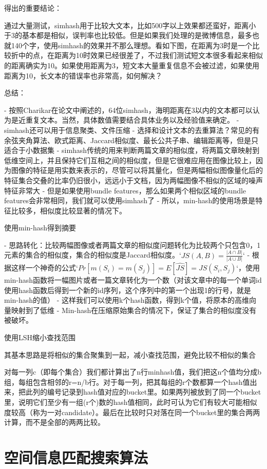 得出的重要结论：

通过大量测试，simhash用于比较大文本，比如500字以上效果都还蛮好，距离小于3的基本都是相似，误判率也比较低。但是如果我们处理的是微博信息，最多也就140个字，使用simhash的效果并不那么理想。看如下图，在距离为3时是一个比较折中的点，在距离为10时效果已经很差了，不过我们测试短文本很多看起来相似的距离确实为10。如果使用距离为3，短文本大量重复信息不会被过滤，如果使用距离为10，长文本的错误率也非常高，如何解决？

总结：

- 按照Charikar在论文中阐述的，64位simhash，海明距离在3以内的文本都可以认为是近重复文本。当然，具体数值需要结合具体业务以及经验值来确定。 
- simhash还可以用于信息聚类、文件压缩
- 选择和设计文本的去重算法？常见的有余弦夹角算法、欧式距离、Jaccard相似度、最长公共子串、编辑距离等，但是只适合于小数据集
- simhash传统的用来判断两篇文章的相似度，将两篇文章映射到低维空间上，并且保持它们互相之间的相似度，但是它很难应用在图像比较上，因为图像的特征是用实数来表示的，尽管可以将其量化，但是两幅相似图像量化后的特征集合交叠的比率仍旧很小，远远小于文档，因为两幅图像不相似的区域的噪声特征非常大
- 但是如果使用bundle features，那么如果两个相似区域的bundle features会非常相同，我们就可以使用simhash了
- 所以，min-hash的使用场景是特征比较多，相似度比较显著的情况下。


使用min-hash得到摘要

- 思路转化：比较两幅图像或者两篇文章的相似度问题转化为比较两个只包含0，1元素的集合的相似度，集合的相似度是Jaccard相似度。`\(JS(A,B)=\frac{|A\cap{B}|}{|A\cup{B}|}\)`
- 根据这样一个神奇的公式`\(Pr[m(S_i) = m(S_j)] = E[\hat{JS}] =JS(S_i,S_j)\)`，使用min-hash函数将一幅图片或者一篇文章转化为一个数（对该文章中的每一个单词id使用hash函数后得到一个新的id序列，这个序列中的第一个出现1的行号，就是min-hash的值）
- 这样我们可以使用k个hash函数，得到k个值，将原本的高维向量映射到了低维
- Min-hash在压缩原始集合的情况下，保证了集合的相似度没有被破坏。

使用LSH缩小查找范围

其基本思路是将相似的集合聚集到一起，减小查找范围，避免比较不相似的集合

对每一列c（即每个集合）我们都计算出了n行minhash值，我们把这n个值均分成b组，每组包含相邻的r=n/b行。对于每一列，把其每组的r个数都算一个hash值出来，把此列的编号记录到hash值对应的bucket里。如果两列被放到了同一个bucket里，说明它们至少有一组(r个)数的hash值相同，此时可认为它们有较大可能相似度较高（称为一对candidate）。最后在比较时只对落在同一个bucket里的集合两两计算，而不是全部的两两比较。

\section{空间信息匹配搜索算法}


